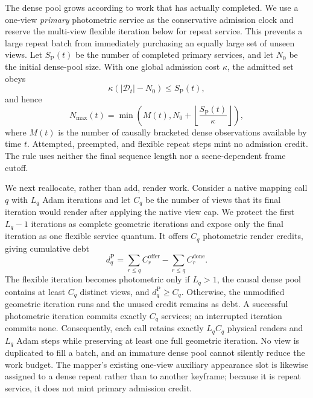The dense pool grows according to work that has actually completed.  We use a
one-view \emph{primary} photometric service as the conservative admission
clock and reserve the multi-view flexible iteration below for repeat service.
This prevents a large repeat batch from immediately purchasing an equally
large set of unseen views.  Let $S_{\mathrm P}(t)$ be the number of completed
primary services, and let $N_0$ be the initial dense-pool size.  With one
global admission cost $\kappa$, the admitted set obeys
\begin{equation}
    \kappa\left(|\mathcal D_t|-N_0\right)
    \leq S_{\mathrm P}(t),
    \label{eq:view_growth_constraint}
\end{equation}
and hence
\begin{equation}
    N_{\max}(t)
    =
    \min\left(
        M(t),
        N_0+\left\lfloor\frac{S_{\mathrm P}(t)}{\kappa}\right\rfloor
    \right),
    \label{eq:view_growth_bound}
\end{equation}
where $M(t)$ is the number of causally bracketed dense observations available
by time $t$.  Attempted, preempted, and flexible repeat steps mint no admission
credit.  The rule uses neither the final sequence length nor a scene-dependent
frame cutoff.

We next reallocate, rather than add, render work.  Consider a native mapping
call $q$ with $L_q$ Adam iterations and let $C_q$ be the number of views that
its final iteration would render after applying the native view cap.  We
protect the first $L_q-1$ iterations as complete geometric iterations and
expose only the final iteration as one flexible service quantum.  It offers
$C_q$ photometric render credits, giving cumulative debt
\begin{equation}
    d_q^{\mathrm P}
    =
    \sum_{r\leq q} C_r^{\mathrm{offer}}
    -
    \sum_{r\leq q} C_r^{\mathrm{done}}.
    \label{eq:photometric_service_debt}
\end{equation}
The flexible iteration becomes photometric only if $L_q>1$, the causal dense
pool contains at least $C_q$ distinct views, and $d_q^{\mathrm P}\geq C_q$.
Otherwise, the unmodified geometric iteration runs and the unused credit
remains as debt.  A successful photometric iteration commits exactly $C_q$
services; an interrupted iteration commits none.  Consequently, each call
retains exactly $L_qC_q$ physical renders and $L_q$ Adam steps while preserving
at least one full geometric iteration.  No view is duplicated to fill a batch,
and an immature dense pool cannot silently reduce the work budget.
The mapper's existing one-view auxiliary appearance slot is likewise assigned
to a dense repeat rather than to another keyframe; because it is repeat service,
it does not mint primary admission credit.

